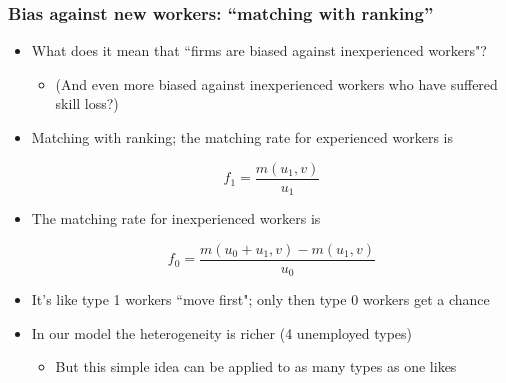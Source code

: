 \documentclass[9pt,xcolor={svgnames}]{beamer}
\begin{document}

\begin{frame}

\frametitle{Bias against new workers: ``matching with ranking''}

\begin{itemize}
\setlength\itemsep{1.8em}

\item What does it mean that ``firms are biased against inexperienced workers"?
\begin{itemize}
\smallskip
\item (And even more biased against inexperienced workers who have suffered skill loss?)    
\end{itemize}

\item Matching with ranking; the matching rate for experienced workers is  

\begin{equation}
f_1=\frac{m(u_1,v)}{u_1}\nonumber
\end{equation}

\item The matching rate for inexperienced workers is

\begin{equation}
f_0=\frac{m(u_0+u_1,v)-m(u_1,v)}{u_0}\nonumber
\end{equation}

\item It's like type 1 workers ``move first"; only then type 0 workers get a chance

\item In our model the heterogeneity is richer (4 unemployed types)
\smallskip
\begin{itemize}
\item But this simple idea can be applied to as many types as one likes    
\end{itemize}

\end{itemize}
\end{frame}


\end{document}
